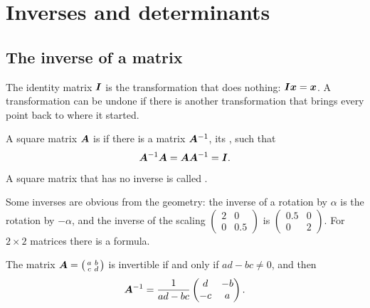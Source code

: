 \section{Inverses and determinants}\label{sec:inverses}

\subsection{The inverse of a matrix}

The identity matrix $\bm{I}$ is the transformation that does nothing:
$\bm{I}\bm{x} = \bm{x}$. A transformation can be undone if there is another
transformation that brings every point back to where it started.

\begin{definition}\label{def:inverse-matrix}
A square matrix $\bm{A}$ is  if there is a
matrix $\bm{A}^{-1}$, its , such that
\[
  \bm{A}^{-1}\bm{A} = \bm{A}\bm{A}^{-1} = \bm{I} .
\]
A square matrix that has no inverse is called .
\end{definition}

Some inverses are obvious from the geometry: the inverse of a rotation by
$\alpha$ is the rotation by $-\alpha$, and the inverse of the scaling
$\left(\begin{smallmatrix} 2 & 0\\ 0 & 0.5\end{smallmatrix}\right)$ is
$\left(\begin{smallmatrix} 0.5 & 0\\ 0 & 2\end{smallmatrix}\right)$. For
$2\times 2$ matrices there is a formula.

\begin{theorem}\label{thm:inverse-2x2}
The matrix $\bm{A} = \left(\begin{smallmatrix} a & b\\ c & d\end{smallmatrix}\right)$
is invertible if and only if $ad - bc \neq 0$, and then
\[
  \bm{A}^{-1} = \frac{1}{ad - bc}\begin{pmatrix} d & -b\\ -c & a\end{pmatrix}.
\]
\end{theorem}

